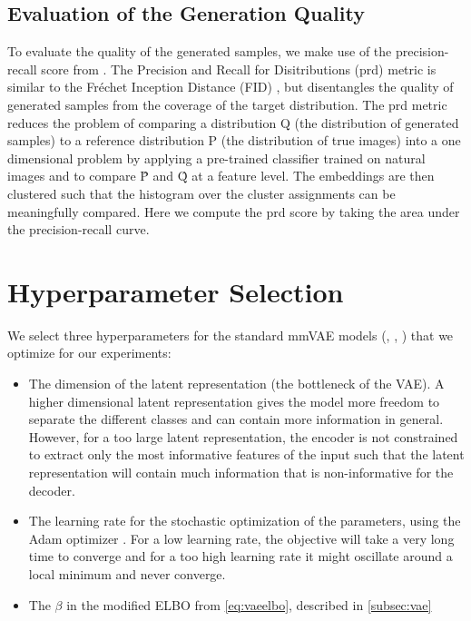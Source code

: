 \subsection{Evaluation of the Generation Quality}
\label{subsubsec:gen_qual}
To evaluate the quality of the generated samples, we make use of the precision-recall score from \citep{precision_recall_distributions}.
The Precision and Recall for Disitributions (prd) metric is similar to the Fréchet Inception Distance (FID) \citep{heusel_gans_2017}, but disentangles the quality of generated samples from the coverage of the target distribution.
The prd metric reduces the problem of comparing a distribution Q (the distribution of generated samples) to a reference distribution P (the distribution of true images) into a one dimensional problem by applying a pre-trained classifier trained on natural images and to compare \^{P} and \^{Q} at a feature level.
The embeddings are then clustered such that the histogram over the cluster assignments can be meaningfully compared.
Here we compute the prd score by taking the area under the precision-recall curve.



\section{Hyperparameter Selection}
\label{sec:Hyperparameter Selection}
We select three hyperparameters for the standard mmVAE models (, , ) that we optimize for our experiments:

\begin{itemize}
    \item The dimension of the latent representation (the bottleneck of the VAE).
    A higher dimensional latent representation gives the model more freedom to separate the different classes and can contain more information in general.
    However, for a too large latent representation, the encoder is not constrained to extract only the most informative features of the input such that the latent representation will contain much information that is non-informative for the decoder.
    \item The learning rate for the stochastic optimization of the parameters, using the Adam optimizer \citep{kingma_adam_2017}.
    For a low learning rate, the objective will take a very long time to converge and for a too high learning rate it might oscillate around a local minimum and never converge.
    \item The $\beta$ in the modified ELBO from \cref{eq:vaeelbo}, described in \cref{subsec:vae}
\end{itemize}

